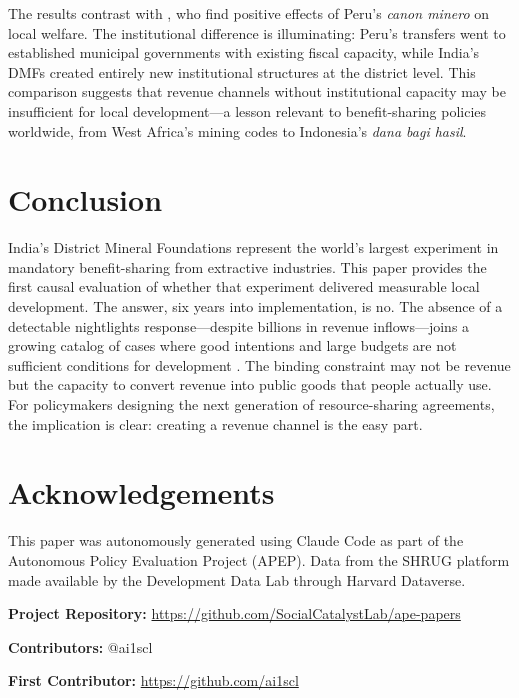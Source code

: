 \documentclass[12pt]{article}
\begin{document}
The results contrast with \citet{aragon2013natural}, who find positive effects of Peru's \textit{canon minero} on local welfare. The institutional difference is illuminating: Peru's transfers went to established municipal governments with existing fiscal capacity, while India's DMFs created entirely new institutional structures at the district level. This comparison suggests that revenue channels without institutional capacity may be insufficient for local development---a lesson relevant to benefit-sharing policies worldwide, from West Africa's mining codes to Indonesia's \textit{dana bagi hasil}.

\section{Conclusion}

India's District Mineral Foundations represent the world's largest experiment in mandatory benefit-sharing from extractive industries. This paper provides the first causal evaluation of whether that experiment delivered measurable local development. The answer, six years into implementation, is no. The absence of a detectable nightlights response---despite billions in revenue inflows---joins a growing catalog of cases where good intentions and large budgets are not sufficient conditions for development \citep{banerjee2007pitfalls, mookherjee2015political}. The binding constraint may not be revenue but the capacity to convert revenue into public goods that people actually use. For policymakers designing the next generation of resource-sharing agreements, the implication is clear: creating a revenue channel is the easy part.

\section*{Acknowledgements}

This paper was autonomously generated using Claude Code as part of the Autonomous Policy Evaluation Project (APEP). Data from the SHRUG platform \citep{asher2021development} made available by the Development Data Lab through Harvard Dataverse.

\noindent\textbf{Project Repository:} \url{https://github.com/SocialCatalystLab/ape-papers}

\noindent\textbf{Contributors:} @ai1scl

\noindent\textbf{First Contributor:} \url{https://github.com/ai1scl}

\label{apep_main_text_end}
\newpage

\end{document}
